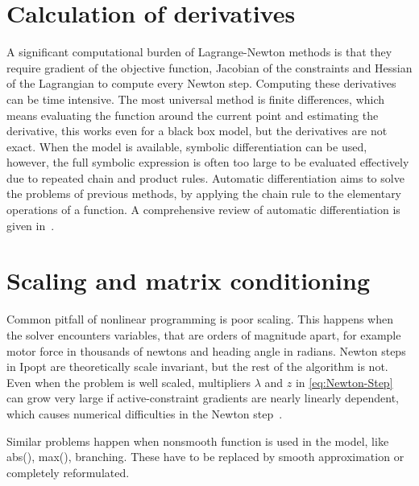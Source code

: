 
\section{Calculation of derivatives}
A significant computational burden of Lagrange-Newton methods is that they require gradient of the objective function, Jacobian of the constraints and Hessian of the Lagrangian to compute every Newton step. Computing these derivatives can be time intensive. The most universal method is finite differences, which means evaluating the function around the current point and estimating the derivative, this works even for a black box model, but the derivatives are not exact. When the model is available, symbolic differentiation can be used, however, the full symbolic expression is often too large to be evaluated effectively due to repeated chain and product rules. Automatic differentiation aims to solve the problems of previous methods, by applying the chain rule to the elementary operations of a function. A comprehensive review of automatic differentiation is given in~\cite{cortildBriefReviewAutomatic2023}.


\section{Scaling and matrix conditioning}
Common pitfall of nonlinear programming is poor scaling. This happens when the
solver encounters variables, that are orders of magnitude apart, for example
motor force in thousands of newtons and heading angle in radians. Newton steps in Ipopt are theoretically scale invariant, but the rest of the algorithm is not. Even when the problem is well scaled, multipliers $\lambda$ and $z$ in \eqref{eq:Newton-Step} can grow very large if active-constraint gradients are nearly linearly dependent, which causes numerical difficulties in the Newton step~\cite[p.~21]{wachter_implementation_2006}.

Similar problems happen when nonsmooth function is used in the model, like abs(), max(), branching. These have to be replaced by smooth approximation or completely reformulated.



